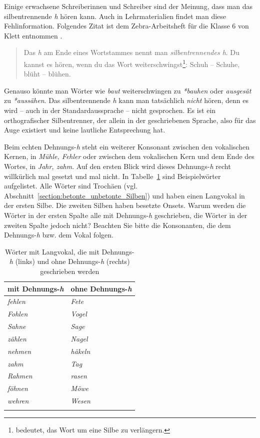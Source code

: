 Einige erwachsene Schreiberinnen und Schreiber sind der Meinung, dass man das silbentrennende \textit{h} hören kann. Auch in Lehrmaterialien findet man diese Fehlinformation. Folgendes Zitat ist dem Zebra-Arbeitsheft für die Klasse 6 von Klett entnommen \citep[22]{Bambergetal2018}. 

\begin{quote}
Das \textit{h} am Ende eines Wortstammes nennt man \textit{silbentrennendes h}. Du kannst es hören, wenn du das Wort weiterschwingst\footnote{ bedeutet, das Wort um eine Silbe zu verlängern.}: Schuh -- Schuhe, blüht -- blühen.
\end{quote}

Genauso könnte man Wörter wie \textit{baut} weiterschwingen zu \textit{*bauhen} oder \textit{ausgesät} zu \textit{*aussähen}. Das silbentrennende \textit{h} kann man tatsächlich \textit{nicht} hören, denn es wird -- auch in der Standardaussprache -- nicht gesprochen.  Es ist ein orthografischer Silbentrenner, der allein in der geschriebenen Sprache, also für das Auge existiert und keine lautliche Entsprechung hat.

Beim echten Dehnungs-\textit{h} steht ein weiterer Konsonant zwischen den vokalischen Kernen, \zB in \textit{Mühle, Fehler} oder zwischen dem vokalischen Kern und dem Ende des Wortes, \zB in \textit{Jahr, zahm}. Auf den ersten Blick wird dieses Dehnungs-\textit{h} recht willkürlich mal gesetzt und mal nicht. In Tabelle~\ref{DehnungshSono} sind Beispielwörter aufgelistet. Alle Wörter sind Trochäen (vgl. Abschnitt~\ref{section:betonte_unbetonte_Silben}) und haben einen Langvokal in der ersten Silbe. Die zweiten Silben haben besetzte Onsets. Warum werden die Wörter in der ersten Spalte alle mit Dehnungs-\textit{h} geschrieben, die Wörter in der zweiten Spalte jedoch nicht? Beachten Sie bitte die Konsonanten, die dem Dehnungs-\textit{h} bzw. dem Vokal folgen.

\begin{table}
\caption{\label{DehnungshSono} Wörter mit Langvokal, die mit Dehnungs-\textit{h} (links) und ohne Dehnungs-\textit{h} (rechts) geschrieben werden}
\begin{tabular}{ll}\lsptoprule
mit Dehnungs-\textit{h}&ohne Dehnungs-\textit{h}\\\midrule
\textit{fehlen}& \textit{Fete}\\
\textit{Fohlen} & \textit{Vogel}\\
\textit{Sahne} & \textit{Sage}\\
\textit{zählen} & \textit{Nagel}\\
\textit{nehmen} & \textit{häkeln} \\
\textit{zahm} & \textit{Tag}\\
\textit{Rahmen} & \textit{rasen}\\
\textit{föhnen} & \textit{Möwe}\\
\textit{wehren} & \textit{Wesen}\\\lspbottomrule
\end{tabular}
\end{table}

